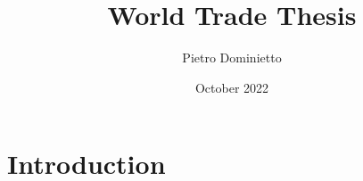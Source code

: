 \documentclass{article}
\title{World Trade Thesis}
\author{Pietro Dominietto}
\date{October 2022}
\begin{document}
\maketitle

\section{Introduction}
\end{document}
